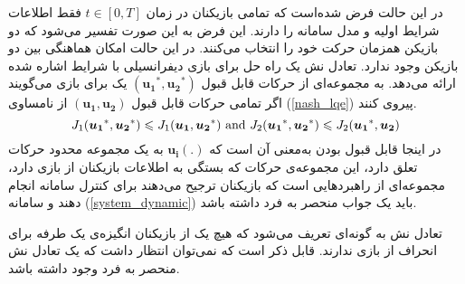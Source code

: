 در این حالت فرض شده‌است که تمامی بازیکنان در زمان 
$t \in [0, T]$
فقط اطلاعات شرایط اولیه و مدل سامانه را دارند. این فرض به این صورت تفسیر می‌شود که دو بازیکن همزمان حرکت خود را انتخاب می‌کنند. در این حالت امکان هماهنگی بین دو بازیکن وجود ندارد. تعادل نش یک راه حل برای بازی دیفرانسیلی با شرایط اشاره شده ارائه می‌دهد.
به مجموعه‌ای از حرکات قابل قبول 
$(\boldsymbol{u_1}^*,  \boldsymbol{u_2}^*)$
یک  برای بازی می‌گویند اگر تمامی حرکات قابل قبول 
$(\boldsymbol{u_1},  \boldsymbol{u_2})$
از نامساوی (\ref{nash_lqe}) پیروی کنند.
\begin{equation}\label{nash_lqe}
	J_1(\boldsymbol{u_1}^*, \boldsymbol{u_2}^*)\leq J_1(\boldsymbol{u_1}, \boldsymbol{u_2}^*) \text{\rm{ and }}
	J_2(\boldsymbol{u_1}^*, \boldsymbol{u_2}^*)\leq 
	J_2(\boldsymbol{u_1}^*, \boldsymbol{u_2})
\end{equation}
در اینجا قابل قبول بودن به‌معنی آن است که
$\boldsymbol{u_i}(.)$
به یک مجموعه محدود حرکات تعلق دارد، این مجموعه‌ی حرکات که بستگی به اطلاعات بازیکنان از بازی دارد، مجموعه‌ای از راهبردهایی است که بازیکنان ترجیح می‌دهند برای کنترل سامانه انجام دهند و سامانه 
(\ref{system_dynamic})
باید یک جواب منحصر به فرد داشته باشد. 


تعادل نش به گونه‌ای تعریف می‌شود که هیچ یک از بازیکنان انگیزه‌ی یک طرفه برای انحراف از بازی ندارند. قابل ذکر است که نمی‌توان انتظار داشت که یک تعادل نش منحصر به فرد وجود داشته باشد. 
